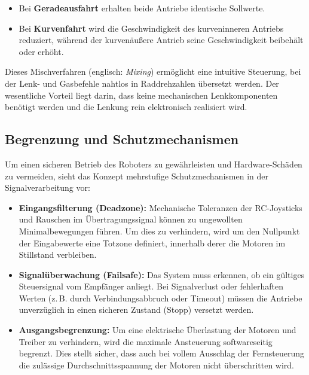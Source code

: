 \begin{itemize}
	\item Bei \textbf{Geradeausfahrt} erhalten beide Antriebe identische Sollwerte.
	
	\item Bei \textbf{Kurvenfahrt} wird die Geschwindigkeit des kurveninneren Antriebs reduziert, während der kurvenäußere Antrieb seine Geschwindigkeit beibehält oder erhöht.
\end{itemize}

Dieses Mischverfahren (englisch: \textit{Mixing}) ermöglicht eine intuitive Steuerung, bei der Lenk- und Gasbefehle nahtlos in Raddrehzahlen übersetzt werden. Der wesentliche Vorteil liegt darin, dass keine mechanischen Lenkkomponenten benötigt werden und die Lenkung rein elektronisch realisiert wird.

\subsection{Begrenzung und Schutzmechanismen}%
\label{cha:Begrenzung und Schutzmechanismen}

Um einen sicheren Betrieb des Roboters zu gewährleisten und Hardware-Schäden zu vermeiden, sieht das Konzept mehrstufige Schutzmechanismen in der Signalverarbeitung vor:

\begin{itemize}
	\item \textbf{Eingangsfilterung (Deadzone):} Mechanische Toleranzen der RC-Joysticks und Rauschen im Übertragungssignal können zu ungewollten Minimalbewegungen führen. Um dies zu verhindern, wird um den Nullpunkt der Eingabewerte eine Totzone definiert, innerhalb derer die Motoren im Stillstand verbleiben.
	
	\item \textbf{Signalüberwachung (Failsafe):} Das System muss erkennen, ob ein gültiges Steuersignal vom Empfänger anliegt. Bei Signalverlust oder fehlerhaften Werten (z.\,B. durch Verbindungsabbruch oder Timeout) müssen die Antriebe unverzüglich in einen sicheren Zustand (Stopp) versetzt werden.
	
	\item \textbf{Ausgangsbegrenzung:} Um eine elektrische Überlastung der Motoren und Treiber zu verhindern, wird die maximale Ansteuerung softwareseitig begrenzt. Dies stellt sicher, dass auch bei vollem Ausschlag der Fernsteuerung die zulässige Durchschnittsspannung der Motoren nicht überschritten wird.
\end{itemize}

